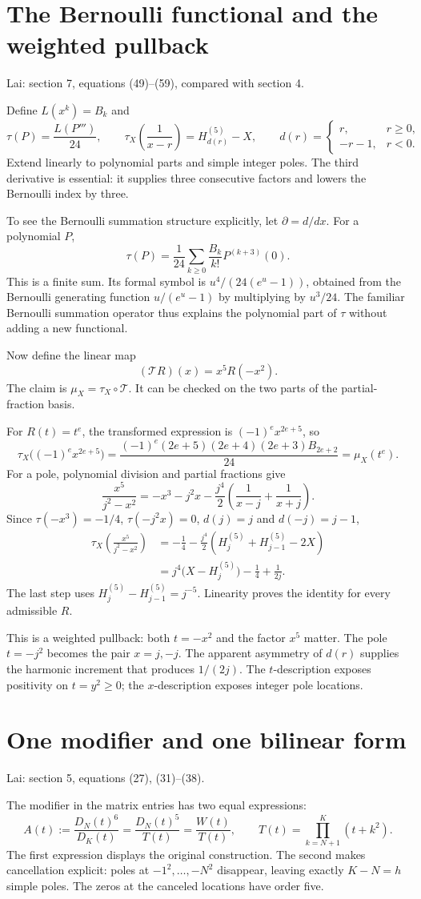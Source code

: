 \documentclass[11pt]{article}
\newcommand{\Hfive}[1]{H_{#1}^{(5)}}
\newcommand{\source}[1]{{\small\color{blue!45!black}Lai: #1.}\par}
\newcommand{\pagetitle}[2]{\section*{#1}\source{#2}}
\begin{document}
\newpage
\pagetitle{The Bernoulli functional and the weighted pullback}
{section 7, equations (49)--(59), compared with section 4}
Define $L(x^k)=B_k$ and
\[
 \tau(P)=\frac{L(P''')}{24},\qquad
 \tau_X\!\left(\frac1{x-r}\right)=\Hfive{d(r)}-X,
 \qquad
 d(r)=\begin{cases}r,&r\geq0,\\-r-1,&r<0.\end{cases}
\]
Extend linearly to polynomial parts and simple integer poles. The third
derivative is essential: it supplies three consecutive factors and lowers
the Bernoulli index by three.

To see the Bernoulli summation structure explicitly, let $\partial=d/dx$.
For a polynomial $P$,
\[
 \tau(P)=\frac1{24}\sum_{k\geq0}\frac{B_k}{k!}P^{(k+3)}(0).
\]
This is a finite sum. Its formal symbol is
$u^4/(24(e^u-1))$, obtained from the Bernoulli generating function
$u/(e^u-1)$ by multiplying by $u^3/24$. The familiar Bernoulli summation
operator thus explains the polynomial part of $\tau$ without adding a new
functional.

Now define the linear map
\[
 (\mathcal T R)(x)=x^5R(-x^2).
\]
The claim is $\mu_X=\tau_X\circ\mathcal T$. It can be checked on the two
parts of the partial-fraction basis.

For $R(t)=t^e$, the transformed expression is $(-1)^ex^{2e+5}$, so
\[
 \tau_X\bigl((-1)^ex^{2e+5}\bigr)
 =\frac{(-1)^e(2e+5)(2e+4)(2e+3)B_{2e+2}}{24}
 =\mu_X(t^e).
\]
For a pole, polynomial division and partial fractions give
\[
 \frac{x^5}{j^2-x^2}
 =-x^3-j^2x-\frac{j^4}{2}
       \left(\frac1{x-j}+\frac1{x+j}\right).
\]
Since $\tau(-x^3)=-1/4$, $\tau(-j^2x)=0$, $d(j)=j$ and $d(-j)=j-1$,
\begin{align*}
 \tau_X\!\left(\frac{x^5}{j^2-x^2}\right)
 &=-\frac14-\frac{j^4}{2}
       \left(\Hfive{j}+\Hfive{j-1}-2X\right)\\
 &=j^4\bigl(X-\Hfive{j}\bigr)-\frac14+\frac1{2j}.
\end{align*}
The last step uses $\Hfive{j}-\Hfive{j-1}=j^{-5}$.
Linearity proves the identity for every admissible $R$.

This is a weighted pullback: both $t=-x^2$ and the factor $x^5$ matter.
The pole $t=-j^2$ becomes the pair $x=j,-j$. The apparent asymmetry of
$d(r)$ supplies the harmonic increment that produces $1/(2j)$.
The $t$-description exposes positivity on $t=y^2\geq0$; the
$x$-description exposes integer pole locations.

\newpage
\pagetitle{One modifier and one bilinear form}
{section 5, equations (27), (31)--(38)}
The modifier in the matrix entries has two equal expressions:
\[
 A(t):=\frac{D_N(t)^6}{D_K(t)}
       =\frac{D_N(t)^5}{T(t)}=\frac{W(t)}{T(t)},\qquad
 T(t)=\prod_{k=N+1}^K(t+k^2).
\]
The first expression displays the original construction. The second makes
cancellation explicit: poles at $-1^2,\ldots,-N^2$ disappear, leaving exactly
$K-N=h$ simple poles. The zeros at the canceled locations have order five.
\end{document}
